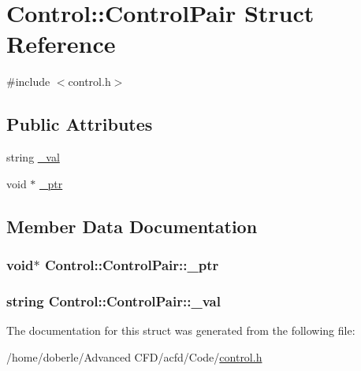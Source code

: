 \hypertarget{struct_control_1_1_control_pair}{}\section{Control\+:\+:Control\+Pair Struct Reference}
\label{struct_control_1_1_control_pair}


{\ttfamily \#include $<$control.\+h$>$}

\subsection*{Public Attributes}
\begin{DoxyCompactItemize}
\item 
string \hyperlink{struct_control_1_1_control_pair_a361316ff538781a3ffecf101c2ca68e2}{\+\_\+val}
\item 
void $\ast$ \hyperlink{struct_control_1_1_control_pair_a3cb5abe162d7147180a4b932167ab110}{\+\_\+ptr}
\end{DoxyCompactItemize}


\subsection{Member Data Documentation}
\subsubsection[{\texorpdfstring{\+\_\+ptr}{_ptr}}]{\setlength{\rightskip}{0pt plus 5cm}void$\ast$ Control\+::\+Control\+Pair\+::\+\_\+ptr}\hypertarget{struct_control_1_1_control_pair_a3cb5abe162d7147180a4b932167ab110}{}\label{struct_control_1_1_control_pair_a3cb5abe162d7147180a4b932167ab110}
\subsubsection[{\texorpdfstring{\+\_\+val}{_val}}]{\setlength{\rightskip}{0pt plus 5cm}string Control\+::\+Control\+Pair\+::\+\_\+val}\hypertarget{struct_control_1_1_control_pair_a361316ff538781a3ffecf101c2ca68e2}{}\label{struct_control_1_1_control_pair_a361316ff538781a3ffecf101c2ca68e2}


The documentation for this struct was generated from the following file\+:\begin{DoxyCompactItemize}
\item 
/home/doberle/\+Advanced C\+F\+D/acfd/\+Code/\hyperlink{control_8h}{control.\+h}\end{DoxyCompactItemize}
